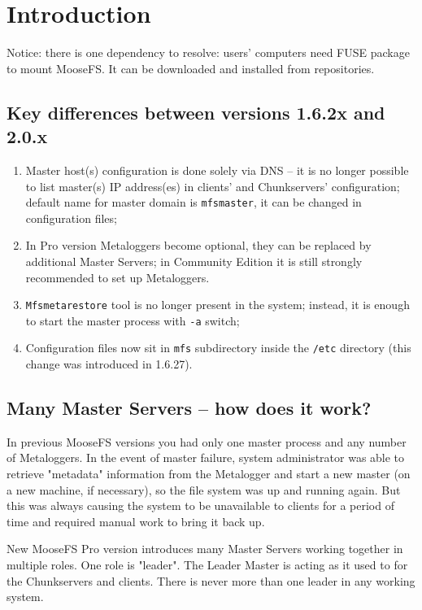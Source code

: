 \documentclass[a4paper,11pt,english]{report}
\def\code#1{\texttt{#1}}
\begin{document}
	\vfill
	
	\tableofcontents
	
	\chapter{Introduction}
	Notice: there is one dependency to resolve: users' computers need FUSE package to mount MooseFS. It can be downloaded and installed from repositories. 
	
	\section{Key differences between versions 1.6.2x and 2.0.x}
		\begin{enumerate}
			\item Master host(s) configuration is done solely via DNS -- it is no longer possible to list master(s) IP address(es) in clients' and Chunkservers' configuration; default name for master domain is \code{mfsmaster}, it can be changed in configuration files;
			\item In Pro version Metaloggers become optional, they can be replaced by additional Master Servers; in Community Edition it is still strongly recommended to set up Metaloggers.
			\item \code{Mfsmetarestore} tool is no longer present in the system; instead, it is enough to start the master process with \code{-a} switch;
			\item Configuration files now sit in \code{mfs} subdirectory inside the \code{/etc} directory (this change was introduced in 1.6.27).
		\end{enumerate}
		
		
	\section{Many Master Servers -- how does it work?}
		In previous MooseFS versions you had only one master process and any number of Metaloggers. In the event of master failure, system administrator was able to retrieve "metadata" information from the Metalogger and start a new master (on a new machine, if necessary), so the file system was up and running again. But this was always causing the system to be unavailable to clients for a period of time and required manual work to bring it back up.
	
		New MooseFS Pro version introduces many Master Servers working together in multiple roles. One role is "leader". The Leader Master is acting as it used to for the Chunkservers and clients. There is never more than one leader in any working system. 
	
\end{document}
